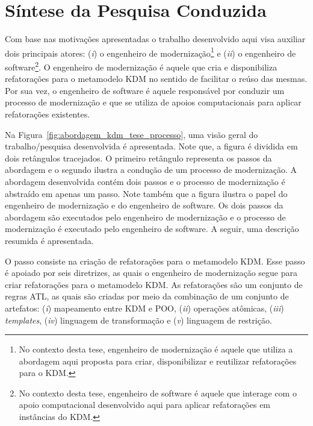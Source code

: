 

\section{Síntese da Pesquisa Conduzida}\label{sec:introducao:a_abordagem_desenvolvida}

Com base nas motivações apresentadas o trabalho desenvolvido aqui visa auxiliar dois principais atores: (\textit{i}) o engenheiro de modernização\footnote{No contexto desta tese, engenheiro de modernização é aquele que utiliza a abordagem aqui proposta para criar, disponibilizar e reutilizar refatorações para o KDM.} e  (\textit{ii}) o engenheiro de software\footnote{No contexto desta tese, engenheiro de software é aquele que interage com o apoio computacional desenvolvido aqui para aplicar refatorações em instâncias do KDM.}. O engenheiro de modernização é aquele que cria e disponibiliza refatorações para o metamodelo KDM no sentido de facilitar o reúso das mesmas. Por sua vez, o engenheiro de software é aquele responsável por conduzir um processo de modernização e que se utiliza de apoios computacionais para aplicar refatorações existentes.





Na Figura~\ref{fig:abordagem_kdm_tese_processo}, uma visão geral do trabalho/pesquisa desenvolvida é apresentada. Note que, a figura é dividida em dois retângulos tracejados. O primeiro retângulo representa os passos da abordagem e o segundo ilustra a condução de um processo de modernização. A abordagem desenvolvida contém dois passos e o processo de modernização é abstraído em apenas um passo. Note também que a figura ilustra o papel do engenheiro de modernização e do engenheiro de software. 
Os dois passos da abordagem são executados pelo engenheiro de modernização e o processo de modernização é executado pelo engenheiro de software. A seguir, uma descrição resumida é apresentada.

O passo  consiste na criação de refatorações para o metamodelo KDM. Esse passo é apoiado por seis diretrizes, as quais o engenheiro de modernização segue para criar refatorações para o metamodelo KDM. As refatorações são um conjunto de regras ATL, as quais são criadas por meio da combinação de um conjunto de artefatos: (\textit{i}) mapeamento entre KDM e POO, (\textit{ii}) operações atômicas, (\textit{iii}) \textit{templates}, (\textit{iv}) linguagem de transformação e (\textit{v}) linguagem de restrição.


